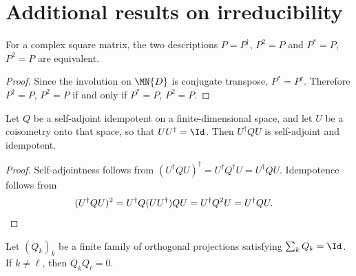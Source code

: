 \section{Additional results on irreducibility}

\begin{theorem}
    \label{thm:orthogonal_projection_star_projection_channel}
    \leanok
    For a complex square matrix, the two descriptions
    $P=P^\dagger$, $P^2=P$ and $P^*=P$, $P^2=P$ are equivalent.
\end{theorem}

\begin{proof}\leanok
    Since the involution on $\MN{D}$ is conjugate transpose,
    $P^*=P^\dagger$. Therefore $P^\dagger=P$, $P^2=P$ if and only if
    $P^*=P$, $P^2=P$.
\end{proof}

\begin{theorem}
    \label{thm:star_projection_coisometric_transport}
    \leanok
    Let $Q$ be a self-adjoint idempotent on a finite-dimensional space, and
    let $U$ be a coisometry onto that space, so that $UU^\dagger=\Id$. Then
    $U^\dagger Q U$ is self-adjoint and idempotent.
\end{theorem}

\begin{proof}\leanok
    Self-adjointness follows from
    $(U^\dagger Q U)^\dagger=U^\dagger Q^\dagger U=U^\dagger Q U$.
    Idempotence follows from
    \begin{align}
        (U^\dagger Q U)^2
         & =U^\dagger Q(UU^\dagger)QU
        =U^\dagger Q^2U
        =U^\dagger Q U.
        \notag
    \end{align}
\end{proof}

\begin{lemma}
    \label{lem:orthogonal_projection_mul_eq_zero_of_sum_eq_one}
    \leanok
    Let $(Q_k)_k$ be a finite family of orthogonal projections satisfying
    $\sum_k Q_k=\Id$. If $k\ne\ell$, then $Q_kQ_\ell=0$.
\end{lemma}

